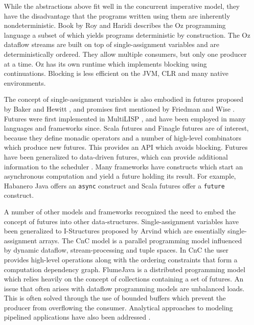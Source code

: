 \documentclass[runningheads,a4paper]{llncs}
\begin{document}
While the abstractions above fit well in the concurrent imperative
model, they have the disadvantage that the programs written using them
are inherently nondeterministic.
Book by Roy and Haridi \cite{RoyH2004} describes the Oz programming language 
a subset of which yields programs deterministic by construction.
The Oz dataflow streams are built on top of
single-assignment variables and are deterministically ordered.
They allow multiple consumers, but only one producer
at a time.
Oz has its own runtime which implements blocking using
continuations.
Blocking is less efficient on the JVM, CLR and many native
environments.

The concept of single-assignment variables is also embodied in
futures proposed by Baker and Hewitt \cite{Hewitt77}, and promises
first mentioned by Friedman and Wise \cite{Wise76}.
Futures were first implemented in MultiLISP \cite{Halstead85},
and have been employed in many languages and frameworks since.
Scala futures \cite{TODO} and Finagle futures \cite{TODO} are
of interest, because they define monadic operators and a
number of high-level combinators which produce new futures.
This provides an API which avoids blocking.
Futures have been generalized to data-driven futures,
which can provide additional information to the scheduler
\cite{Tasirlar11}.
Many frameworks have constructs which start an asynchronous
computation and yield a future holding its result.
For example, Habanero Java \cite{Shirako11} offers an \verb=async=
construct and Scala futures offer a \verb=future= construct.

A number of other models and frameworks recognized the need to embed
the concept of futures into other data-structures.
Single-assignment variables have been generalized to I-Structures
proposed by Arvind \cite{Arvind89} which are essentially
single-assignment arrays.
The CnC model \cite{Burke11} \cite{CnC10} is a parallel programming model
influenced by dynamic dataflow, stream-processing and tuple spaces.
In CnC the user provides high-level operations along with the ordering
constraints that form a computation dependency graph.
FlumeJava \cite{Chambers10} is a distributed programming model which
relies heavily on the concept of collections containing a set of
futures.
An issue that often arises with dataflow programming models are
unbalanced loads.
This is often solved through the use of bounded buffers which prevent
the producer from overflowing the consumer.
Analytical approaches to modeling pipelined applications have also
been addressed \cite{Cascaval09}.
\end{document}
